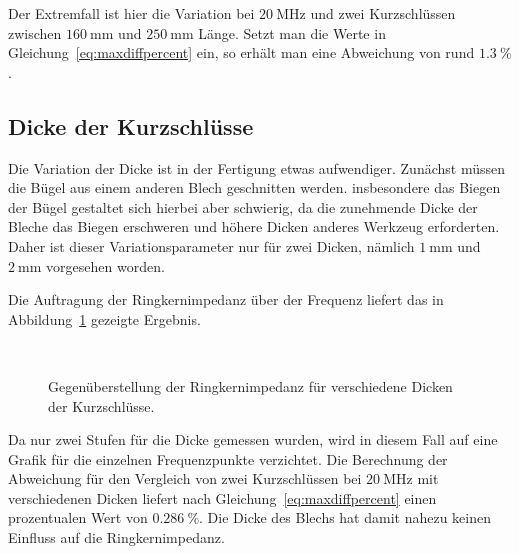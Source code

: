 Der Extremfall ist hier die Variation bei $\SI{20}{\mega\hertz}$ und zwei Kurzschl\"ussen zwischen $\SI{160}{\milli\meter}$ und $\SI{250}{\milli\meter}$ L\"ange. Setzt man die Werte in Gleichung~\ref{eq:maxdiffpercent} ein, so erh\"alt man eine Abweichung von rund $\SI{1,3}{\%}$. 

\subsection{Dicke der Kurzschl\"usse}
Die Variation der Dicke ist in der Fertigung etwas aufwendiger. Zun\"achst m\"ussen die B\"ugel aus einem anderen Blech geschnitten werden. insbesondere das Biegen der B\"ugel gestaltet sich hierbei aber schwierig, da die zunehmende Dicke der Bleche das Biegen erschweren und h\"ohere Dicken anderes Werkzeug erforderten. Daher ist dieser Variationsparameter nur f\"ur zwei Dicken, n\"amlich $\SI{1}{\milli\meter}$ und $\SI{2}{\milli\meter}$ vorgesehen worden.
\par
Die Auftragung der Ringkernimpedanz \"uber der Frequenz liefert das in Abbildung~\ref{fig:ringcorethick} gezeigte Ergebnis.



\newpage




\begin{figure}[htb]
	\centering
	\\
	\caption{Gegen\"uberstellung der Ringkernimpedanz f\"ur verschiedene Dicken der Kurzschl\"usse.}
	\label{fig:ringcorethick}
\end{figure}

Da nur zwei Stufen f\"ur die Dicke gemessen wurden, wird in diesem Fall auf eine Grafik f\"ur die einzelnen Frequenzpunkte verzichtet. Die Berechnung der Abweichung f\"ur den Vergleich von zwei Kurzschl\"ussen bei $\SI{20}{\mega\hertz}$ mit verschiedenen Dicken liefert nach Gleichung~\ref{eq:maxdiffpercent} einen prozentualen Wert von $\SI{0,286}{\%}$. 
Die Dicke des Blechs hat damit nahezu keinen Einfluss auf die Ringkernimpedanz.



\newpage